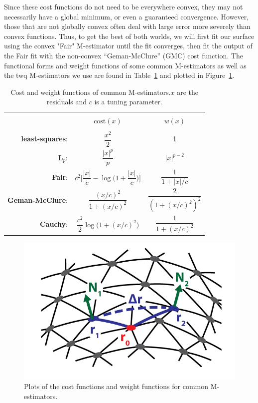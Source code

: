 Since these cost functions do not need to be everywhere convex, they may not necessarily have a global minimum, or even a guaranteed convergence.
However, those that are not globally convex often deal with large error more severely than convex functions.
Thus, to get the best of both worlds, we will first fit our surface using the convex "Fair" M-estimator until the fit converges, then fit the output of the Fair fit with the non-convex ``Geman-McClure'' (GMC) cost function.
The functional forms and weight functions of some common M-estimators as well as the twq M-estimators we use are found in Table~\ref{t:3-CostFxn} and plotted in Figure~\ref{f:3-CostFxn}.
\newpage
\begin{table}[ht]
  \centering
  \caption{Cost and weight functions of common M-estimators.\@$x$ are the residuals and $c$ is a tuning parameter.}
  \begin{tabular}{|r c c |}
    \hline \\[-0.45cm]
     & $\textrm{cost}(x)$ & $w(x)$\\
    \hline \\[-0.3cm]
    {\bf least-squares}:& $\dfrac{x^2}{2}$ & 1\\ [0.5cm]
    {\bf L$_p$}:& $ \dfrac{|x|^p}{p} $ & $|x|^{p-2}$\\[0.5cm]
    {\bf Fair}:& $c^2 \Bigg [ \dfrac{|x|}{c} - \log \Big ( 1 + \dfrac{|x|}{c}\Big ) \Bigg ]$ & $\dfrac{1}{1 + |x|/c}$ \\ [0.5cm]
    {\bf Geman-McClure}:& $\dfrac{(x/c)^2}{1+(x/c)^2}$ & $\dfrac{2}{(1+(x/c)^2)^2}$ \\ [0.5cm]
    {\bf Cauchy}:& $\dfrac{c^2}{2} \log \big ( 1 + (x/c)^2 \big)$ & $\dfrac{1}{1 + (x/c)^2}$\\ [0.5cm]
    \hline
  \end{tabular}\label{t:3-CostFxn}
\end{table}

\begin{figure}[hb]
  \centering
  \includegraphics{figures/C3/Ch3-Figs_CurvFitSchem.png}
  \caption{Plots of the cost functions and weight functions for common M-estimators.}\label{f:3-CostFxn}
\end{figure}
\newpage
